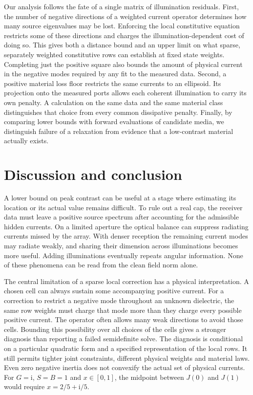 \documentclass[anonymous,12pt]{iopjournal}
\numberwithin{equation}{section}
\begin{document}
Our analysis follows the fate of a single matrix of illumination residuals. First, the number of negative directions of a weighted current operator determines how many source eigenvalues may be lost. Enforcing the local constitutive equation restricts some of these directions and charges the illumination-dependent cost of doing so. This gives both a distance bound and an upper limit on what sparse, separately weighted constitutive rows can establish at fixed state weights. Completing just the positive square also bounds the amount of physical current in the negative modes required by any fit to the measured data. Second, a positive material loss floor restricts the same currents to an ellipsoid. Its projection onto the measured ports allows each coherent illumination to carry its own penalty. A calculation on the same data and the same material class distinguishes that choice from every common dissipative penalty. Finally, by comparing lower bounds with forward evaluations of candidate media, we distinguish failure of a relaxation from evidence that a low-contrast material actually exists.





\section{Discussion and conclusion}\label{sec:discussion}

A lower bound on peak contrast can be useful at a stage where estimating its location or its actual value remains difficult. To rule out a real cap, the receiver data must leave a positive source spectrum after accounting for the admissible hidden currents. On a limited aperture the optical balance can suppress radiating currents missed by the array. With denser reception the remaining current modes may radiate weakly, and sharing their dimension across illuminations becomes more useful. Adding illuminations eventually repeats angular information. None of these phenomena can be read from the clean field norm alone.

The central limitation of a sparse local correction has a physical interpretation. A chosen cell can always sustain some accompanying positive current. For a correction to restrict a negative mode throughout an unknown dielectric, the same row weights must charge that mode more than they charge every possible positive current. The operator often allows many weak directions to avoid those cells. Bounding this possibility over all choices of the cells gives a stronger diagnosis than reporting a failed semidefinite solve. The diagnosis is conditional on a particular quadratic form and a specified representation of the local rows. It still permits tighter joint constraints, different physical weights and material laws. Even zero negative inertia does not convexify the actual set of physical currents. For $G=\mathrm i$, $S=B=1$ and $x\in[0,1]$, the midpoint between $J(0)$ and $J(1)$ would require $x=2/5+\mathrm i/5$.
\end{document}
